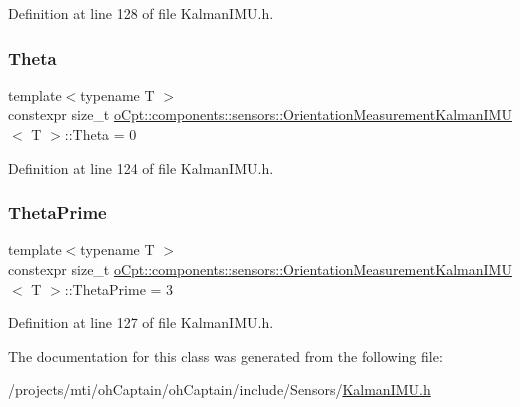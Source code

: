 Definition at line 128 of file Kalman\+I\+M\+U.\+h.

\hypertarget{classo_cpt_1_1components_1_1sensors_1_1_orientation_measurement_kalman_i_m_u_a14e9e1fc1ed30d7a2669d11955b9af09}{}\label{classo_cpt_1_1components_1_1sensors_1_1_orientation_measurement_kalman_i_m_u_a14e9e1fc1ed30d7a2669d11955b9af09} 
\subsubsection{\texorpdfstring{Theta}{Theta}}
{\footnotesize\ttfamily template$<$typename T $>$ \\
constexpr size\+\_\+t \hyperlink{classo_cpt_1_1components_1_1sensors_1_1_orientation_measurement_kalman_i_m_u}{o\+Cpt\+::components\+::sensors\+::\+Orientation\+Measurement\+Kalman\+I\+MU}$<$ T $>$\+::Theta = 0\hspace{0.3cm}{\ttfamily [static]}}



Definition at line 124 of file Kalman\+I\+M\+U.\+h.

\hypertarget{classo_cpt_1_1components_1_1sensors_1_1_orientation_measurement_kalman_i_m_u_a0de05f7ddd25c4727d2ce41598cff191}{}\label{classo_cpt_1_1components_1_1sensors_1_1_orientation_measurement_kalman_i_m_u_a0de05f7ddd25c4727d2ce41598cff191} 
\subsubsection{\texorpdfstring{Theta\+Prime}{ThetaPrime}}
{\footnotesize\ttfamily template$<$typename T $>$ \\
constexpr size\+\_\+t \hyperlink{classo_cpt_1_1components_1_1sensors_1_1_orientation_measurement_kalman_i_m_u}{o\+Cpt\+::components\+::sensors\+::\+Orientation\+Measurement\+Kalman\+I\+MU}$<$ T $>$\+::Theta\+Prime = 3\hspace{0.3cm}{\ttfamily [static]}}



Definition at line 127 of file Kalman\+I\+M\+U.\+h.



The documentation for this class was generated from the following file\+:\begin{DoxyCompactItemize}
\item 
/projects/mti/oh\+Captain/oh\+Captain/include/\+Sensors/\hyperlink{_kalman_i_m_u_8h}{Kalman\+I\+M\+U.\+h}\end{DoxyCompactItemize}
